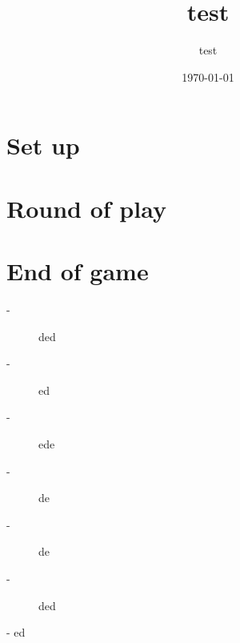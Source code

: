 \documentclass{article}%
\title{test}%
\author{test}%
\date{\today}%
\begin{document}
%
\pagestyle{empty}%
\normalsize%
\maketitle%
\section{ Set up
}%
\label{sec:Setup}%

%
\section{ Round of play
}%
\label{sec:Roundofplay}%

%
\section{ End of game
}%
\label{sec:Endofgame}%
\begin{description}%
\item[{-} ]%
%
 ded
%
\item[{-} ]%
%
 ed
%
\item[{-} ]%
%
 ede
%
\item[{-} ]%
%
 de
%
\item[{-} ]%
%
 de
%
\item[{-} ]%
%
 ded
%
\end{description}%
{-} ed

%
\end{document}
